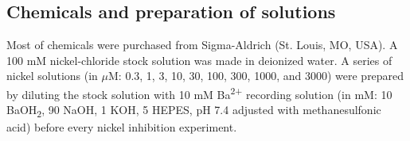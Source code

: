 \subsection*{Chemicals and preparation of solutions}

Most of chemicals were purchased from Sigma-Aldrich (St. Louis, MO, USA).
A 100 mM nickel-chloride stock solution was made in deionized water.
A series of nickel solutions (in $\mu$M: 0.3, 1, 3, 10, 30, 100, 300, 1000, and 3000) were prepared by diluting the stock solution with 10 mM Ba\textsuperscript{2+} recording solution (in mM: 10 BaOH\textsubscript{2}, 90 NaOH, 1 KOH, 5 HEPES, pH 7.4 adjusted with methanesulfonic acid) before every nickel inhibition experiment. 

    